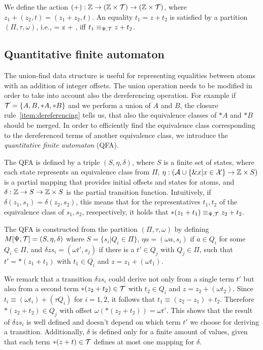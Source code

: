 We define the action $(+): \mathbb{Z} \rightarrow (\mathbb{Z} \times \mathcal{T}) \rightarrow (\mathbb{Z} \times \mathcal{T})$, where $z_1 + (z_2,t) = (z_1 + z_2, t)$.
An equality $t_1 = z + t_2$ is satisfied by a partition $(\Pi, \tau, \omega)$, i.e.,  = z + , iff $t_1 \equiv_{\Psi,\mathcal{T}} z + t_2$.

\subsection{Quantitative finite automaton}\label{subsection:qfa}

The union-find data structure is useful for representing equalities between atoms
with an addition of integer offsets.
The union operation needs to be modified in order to take into account also the dereferencing operation.
For example if $\mathcal{T} = \{A, B, *A, *B\}$ and we perform a union of $A$ and $B$, the
closure rule~\ref{item:dereferencing} tells us, that also the equivalence classes of $*A$ and $*B$ should be merged.
In order to efficiently find the equivalence class corresponding to the dereferenced terms of another equivalence class, we introduce the \emph{quantitative finite automaton} (QFA).

The QFA is defined by a triple $(S, \eta, \delta)$, where $S$ is a finite set of states, where each state represents an equivalence class from $\Pi$, $\eta : (\mathcal{A} \cup \{\&x | x \in \mathcal{X}\} \rightarrow \mathbb{Z} \times S)$ is a partial mapping that provides initial offsets and states for atoms, and $\delta : \mathbb{Z} \rightarrow S \rightarrow \mathbb{Z} \times S$ is the partial transition function.
Intuitively, if $\delta(z_1, s_1) = \delta(z_2, s_2)$, this means that for the representatives
$t_1, t_2$ of the equivalence class of $s_1,s_2$, resepectively, it holds that $*(z_1 + t_1) \equiv_{\Psi,\mathcal{T}} z_2 + t_2$.

The QFA is constructed from the partition  $(\Pi, \tau, \omega)$ by defining $M[\Psi,\mathcal{T}] = (S, \eta, \delta)$ where $S = \{s_i | Q_i \in \Pi\}$, $\eta a = (\omega a, s_i)$ if $a \in Q_i$ for some $Q_i \in \Pi$, and $\delta z s_i = (\omega t', s_j)$ if there is a $t' \in Q_j$ with $Q_j \in \Pi$, such that $t' = *(z_1 + t_1)$ with $t_1 \in Q_i$ and $z = z_1 + (\omega t_1)$.

We remark that a transition $\delta z s_i$ could derive not only from a single term $t'$ but also from a second term $*(z_2 + t_2) \in \mathcal{T}$ with $t_2 \in Q_i$ and $z = z_2 + (\omega t_2)$.
Since $t_i \equiv (\omega t_i) + (\tau Q_i)$ for $i = 1,2$, it follows that $t_1 \equiv (z_2 - z_1)+ t_2$. Therefore $*(z_2+t_2)\in Q_j$ with offset $\omega(*(z_2+t_2)) = \omega t'$.
This shows that the result of $\delta z s_i$ is well defined and doesn't depend on which term $t'$ we choose for deriving a transition.
Additionally, $\delta$ is defined only for a finite amount of values, given that each term $*(z + t) \in \mathcal{T}$ defines at most one mapping for $\delta$.

